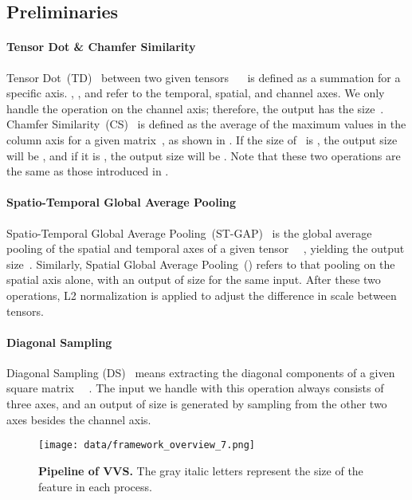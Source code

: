 \documentclass[10pt,twocolumn,letterpaper]{article}
\begin{document}
    \subsection{Preliminaries}
        \paragraph{Tensor Dot \& Chamfer Similarity \\}
            Tensor Dot~(TD)~\cite{yang2016deep} between two given tensors ~~ is defined as a summation for a specific axis. , , and  refer to the temporal, spatial, and channel axes. We only handle the operation on the channel axis; therefore, the output has the size~. Chamfer Similarity~(CS)~\cite{barrow1977parametric} is defined as the average of the maximum values in the column axis for a given matrix~, as shown in . If the size of~ is , the output size will be , and if it is , the output size will be . Note that these two operations are the same as those introduced in \cite{kordopatis2019visil}.
            
            \vspace{-4mm}
        \paragraph{Spatio-Temporal Global Average Pooling \\}
            Spatio-Temporal Global Average Pooling~(ST-GAP)~\cite{lin2013network} is the global average pooling of the spatial and temporal axes of a given tensor ~~, yielding the output size~. Similarly, Spatial Global Average Pooling~() refers to that pooling on the spatial axis alone, with an output of size  for the same input. After these two operations, L2 normalization is applied to adjust the difference in scale between tensors.
            \vspace{-3mm}
        \paragraph{Diagonal Sampling \\}
            Diagonal Sampling (DS)~\cite{kang2022uboco} means extracting the diagonal components of a given square matrix ~~. The input we handle with this operation always consists of three axes, and an output of size  is generated by sampling from the other two axes besides the channel axis.
            \vspace{-0mm}

    \begin{figure}[t!]
        \centering
        \texttt{[image: data/framework\_overview\_7.png]} 
        \vspace{-3mm}
        \caption{\textbf{Pipeline of VVS.} The gray italic letters represent the size of the feature in each process.  \vspace{-3mm}} \label{fig:fig2}
    \end{figure}
    
\end{document}

